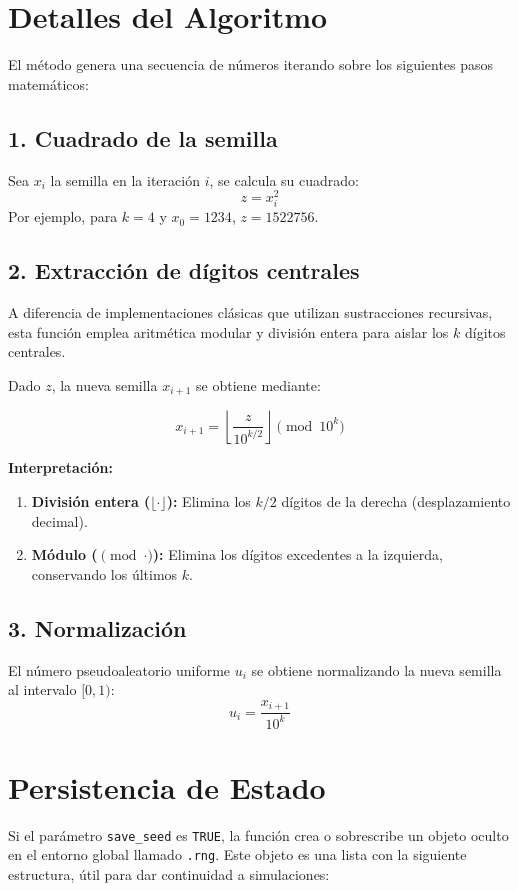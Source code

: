 \documentclass[a4paper,11pt]{article}
\begin{document}
	\section{Detalles del Algoritmo}
	El método genera una secuencia de números iterando sobre los siguientes pasos matemáticos:
	
	\subsection{1. Cuadrado de la semilla}
	Sea $x_i$ la semilla en la iteración $i$, se calcula su cuadrado:
	\begin{equation}
		z = x_i^2
	\end{equation}
	Por ejemplo, para $k=4$ y $x_0=1234$, $z = 1522756$.
	
	\subsection{2. Extracción de dígitos centrales}
	A diferencia de implementaciones clásicas que utilizan sustracciones recursivas, esta función emplea aritmética modular y división entera para aislar los $k$ dígitos centrales. 
	
	Dado $z$, la nueva semilla $x_{i+1}$ se obtiene mediante:
	
	\begin{equation}
		x_{i+1} = \left\lfloor \frac{z}{10^{k/2}} \right\rfloor \pmod{10^k}
	\end{equation}
	
	\textbf{Interpretación:}
	\begin{enumerate}
		\item \textbf{División entera ($\lfloor \cdot \rfloor$):} Elimina los $k/2$ dígitos de la derecha (desplazamiento decimal).
		\item \textbf{Módulo ($\pmod{\cdot}$):} Elimina los dígitos excedentes a la izquierda, conservando los últimos $k$.
	\end{enumerate}
	
	\subsection{3. Normalización}
	El número pseudoaleatorio uniforme $u_i$ se obtiene normalizando la nueva semilla al intervalo $[0, 1)$:
	\begin{equation}
		u_i = \frac{x_{i+1}}{10^k}
	\end{equation}
	
	\section{Persistencia de Estado}
	Si el parámetro \texttt{save\_seed} es \texttt{TRUE}, la función crea o sobrescribe un objeto oculto en el entorno global llamado \texttt{.rng}. Este objeto es una lista con la siguiente estructura, útil para dar continuidad a simulaciones:
	
\end{document}
